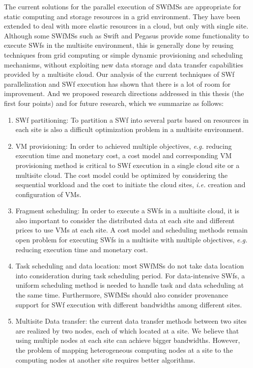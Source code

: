The current solutions for the parallel execution of SWfMSs
are appropriate for static computing and storage resources in a grid environment. 
They have been extended to deal with more elastic resources in a cloud, but only with 
single site.
Although some SWfMSs such as Swift and Pegasus provide some
functionality to execute SWfs in the multisite environment, this is generally done
by reusing techniques from grid computing or simple dynamic provisioning and scheduling mechanisms, without
exploiting new data storage and data transfer capabilities provided by
a multisite cloud.
Our analysis of the current techniques of SWf
parallelization and SWf execution has shown
that there is a lot of room for improvement. 
And we proposed research directions addressed in this thesis (the first four points) and for future research, which we
summarize as follows:


\begin{enumerate}
\item SWf partitioning: To partition a SWf into several parts based on resources in each site is also
a difficult optimization problem in a multisite environment.
\item VM provisioning: In order to achieved multiple objectives, \textit{e.g.} reducing execution time and monetary cost, a cost model and corresponding VM provisioning method is critical to SWf execution in a single cloud site or a multisite cloud. The cost model could be optimized by considering the sequential workload and the cost to initiate the cloud sites, \textit{i.e.} creation and configuration of VMs.
\item Fragment scheduling: In order to execute a SWfs in a multisite cloud, it is also important to consider the distributed data at each site and different prices to use VMs at each site. A cost model and scheduling methods remain open problem for executing SWfs in a multisite with multiple objectives, \textit{e.g.} reducing execution time and monetary cost.
\item Task scheduling and data location: most SWfMSs do not take data location into consideration during task scheduling period. For data-intensive SWfs, a uniform scheduling method is needed to handle task and data scheduling at the same time.
Furthermore, SWfMSs should also consider provenance support for SWf execution with different bandwidths among different sites.
\item Multisite Data transfer: the current data transfer methods between two sites are realized by two nodes, each of which located at a site. We believe that using multiple nodes at each site can achieve bigger bandwidths. However, the problem of mapping heterogeneous computing nodes at a site to the computing nodes at another site requires better algorithms.



\end{enumerate}


